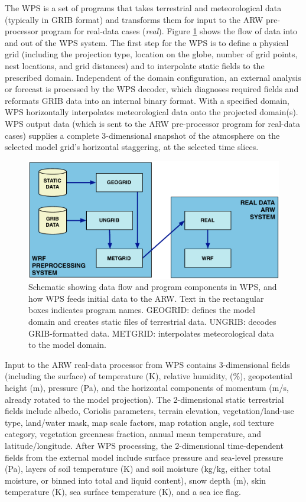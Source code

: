 The WPS is a set of programs that takes
terrestrial and meteorological data (typically in GRIB format) and transforms them for input to
the ARW pre-processor program for real-data cases ({\it real}).
Figure \ref {figure:WPS_real_wrf} shows the flow of data into and out of the WPS system.  
The first step for the WPS is to define a physical grid (including
the projection type, location on the globe, 
number of grid points, nest locations, and grid distances) and
to interpolate static fields to the prescribed domain.
Independent of the domain configuration,
an external analysis or forecast is processed by the WPS decoder,
which diagnoses required fields and
reformats GRIB data into an internal binary format.
With a specified domain,
WPS horizontally interpolates meteorological data onto the projected domain(s). 
WPS output data (which is sent to the ARW pre-processor program for real-data cases) 
supplies a complete 3-dimensional snapshot of the atmosphere
on the selected model grid's horizontal staggering, at the selected time slices.

%
%
\begin{figure}
  \centering
  \includegraphics[width=6in]{figures/WPS_real_wrf.pdf}
  \caption{\label{figure:WPS_real_wrf}Schematic showing 
data flow and program components in WPS, and how WPS feeds initial data to the ARW.
Text in the rectangular boxes indicates program names.
GEOGRID: defines the model domain and creates static files of terrestrial data.  UNGRIB:
decodes GRIB-formatted data. METGRID: interpolates meteorological data to the model domain.}
\end{figure}

Input to the ARW real-data processor from 
WPS contains 3-dimensional fields (including
the surface) of temperature (K), relative humidity,
(\%), geopotential height (m), pressure (Pa), 
and the horizontal components of momentum (m/s, already rotated to the model 
projection).  
The 2-dimensional static terrestrial fields include
albedo, Coriolis parameters, terrain elevation, vegetation/land-use type, 
land/water mask, map scale factors, map rotation angle, soil texture category, vegetation greenness fraction, 
annual mean temperature, 
and latitude/longitude.  
After WPS processing, the 2-dimensional time-dependent fields from the external model include 
surface pressure and sea-level pressure (Pa), layers of soil temperature (K) and  soil moisture (kg/kg, 
either total moisture, or 
binned into total and liquid content), 
snow depth (m), skin temperature (K), sea surface temperature (K), and a sea ice flag.  

